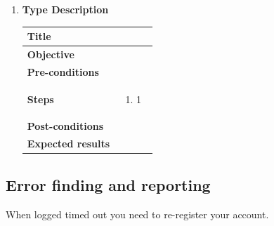 \documentclass[UKenglish,12pt]{article}
\begin{document}
\begin{enumerate}
\item
\textbf{\hspace{0.3cm}Type\hspace{4.4cm} Description}
\newline \vspace{0.2cm}
\begin{tabular}{| p{5cm} | p{10cm} | }
	\hline
	 \textbf{Title} & \\ \hline
	 \textbf{Objective} & \\ \hline
	 \textbf{Pre-conditions} & \\ \hline
	 \textbf{Steps} & \begin{enumerate} \item 1 \end{enumerate} \\ \hline
	 \textbf{Post-conditions} & \\ \hline
	 \textbf{Expected results} & \\ 
	 \hline
\end{tabular} %




\end{enumerate}

\subsection{Error finding and reporting}
When logged timed out you need to re-register your account.
\end{document}
